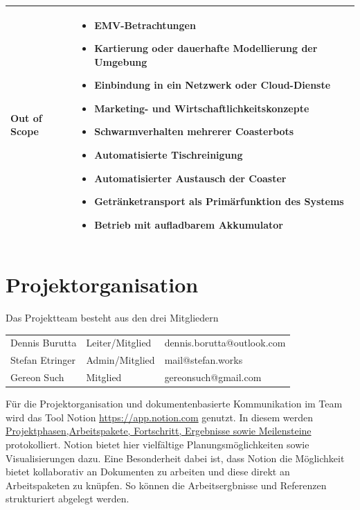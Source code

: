 \documentclass[
  a4paper,
  12pt,
  DIV=12,        %
  parskip=half,  %
  headings=small %
]{scrartcl}
\theoremstyle{definition}
\theoremstyle{definition}
\begin{document}
\begin{longtable}{@{}p{}p{}@{}}
Out of Scope &
\vspace{-\baselineskip}
\begin{itemize}[partopsep=0pt, topsep=6pt, itemsep=2pt]
  \item EMV-Betrachtungen
  \item Kartierung oder dauerhafte Modellierung der Umgebung
  \item Einbindung in ein Netzwerk oder Cloud-Dienste
  \item Marketing- und Wirtschaftlichkeitskonzepte
  \item Schwarmverhalten mehrerer Coasterbots
  \item Automatisierte Tischreinigung
  \item Automatisierter Austausch der Coaster
  \item Getränketransport als Primärfunktion des Systems
  \item Betrieb mit aufladbarem Akkumulator
\end{itemize} \\
\bottomrule

\end{longtable}

\section{Projektorganisation}

Das Projektteam besteht aus den drei Mitgliedern

\begin{center}
\begin{tabular}{lll}
Dennis Burutta & Leiter/Mitglied & dennis.borutta@outlook.com\\
Stefan Etringer & Admin/Mitglied & mail@stefan.works \\
Gereon Such & Mitglied & gereonsuch@gmail.com\\
\end{tabular}
\end{center}




Für die Projektorganisation und dokumentenbasierte Kommunikation im Team wird
das Tool Notion \url{https://app.notion.com} genutzt. In diesem werden
\href{https://app.notion.com/p/Projektarbeit-39a745ea234f80d4b39ace9b616a41de}{Projektphasen,Arbeitspakete, Fortschritt, Ergebnisse sowie Meilensteine}
protokolliert.
Notion bietet hier vielfältige Planungsmöglichkeiten sowie Visualisierungen
dazu. Eine Besonderheit dabei ist, dass Notion die Möglichkeit bietet
kollaborativ an Dokumenten zu arbeiten und diese direkt an Arbeitspaketen zu
knüpfen. So können die Arbeitsergbnisse und Referenzen strukturiert abgelegt
werden.
\end{document}

